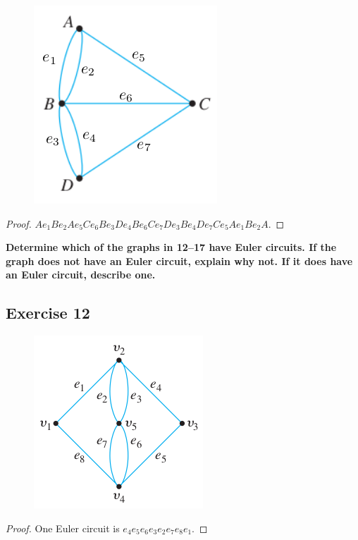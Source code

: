 \documentclass[14pt]{extarticle}
\newcommand{\cy}{\color{cyan}}
\begin{document}
\begin{figure}[ht!]
\centering
\includegraphics[scale=0.5]{../images/10.1.11.png}
\end{figure}

\begin{proof}
\(Ae_1Be_2Ae_5Ce_6Be_3De_4Be_6Ce_7De_3Be_4De_7Ce_5Ae_1Be_2A\). 
\end{proof}

{\bf \cy Determine which of the graphs in 12–17 have Euler circuits. If the graph does not have an Euler circuit, explain 
why not. If it does have an Euler circuit, describe one.}

\subsection{Exercise 12}
\begin{figure}[ht!]
\centering
\includegraphics[scale=0.4]{../images/10.1.12.png}
\end{figure}

\begin{proof}
One Euler circuit is \(e_4e_5e_6e_3e_2e_7e_8e_1\).
\end{proof}
\end{document}
